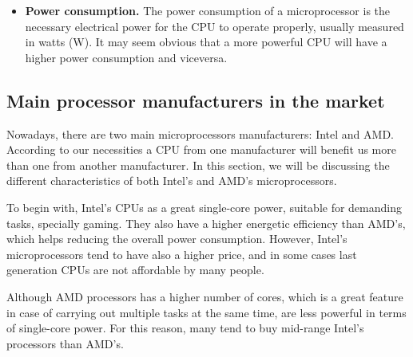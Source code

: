 \documentclass[a4paper, twoside, 11pt]{article}
\begin{document}
{\begin{itemize}
    \item\textbf{Power consumption.} The power consumption of a microprocessor is the necessary electrical power for the CPU to operate properly, usually measured in watts (W). It may seem obvious that a more powerful CPU will have a higher power consumption and viceversa.

\end{itemize}

\subsection{Main processor manufacturers in the market}
\hspace{\parindent} Nowadays, there are two main microprocessors manufacturers: Intel and AMD. According to our necessities a CPU from one manufacturer will benefit us more than one from another manufacturer. In this section, we will be discussing the different characteristics of both Intel's and AMD's microprocessors.

To begin with, Intel's CPUs as a great single-core power, suitable for demanding tasks, specially gaming. They also have a higher energetic efficiency than AMD's, which helps reducing the overall power consumption. However, Intel's microprocessors tend to have also a higher price, and in some cases last generation CPUs are not affordable by many people.

Although AMD processors has a higher number of cores, which is a great feature in case of carrying out multiple tasks at the same time, are less powerful in terms of single-core power. For this reason, many tend to buy mid-range Intel's processors than AMD's.

}
\end{document}
